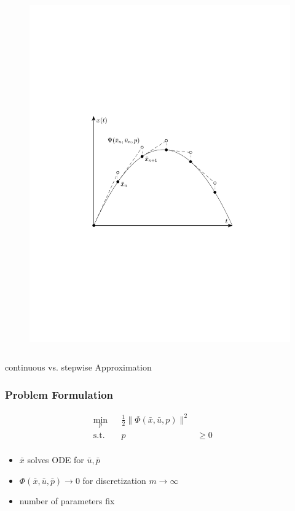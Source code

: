 \begin{frame}
\begin{columns}[t]
\begin{figure}
                \includegraphics[trim=3cm 7cm 3cm 9cm, clip=true, width=\linewidth]{img/stepExplEulerPlot}
            \end{figure}
    \end{columns}
    \begin{center}
        continuous vs. stepwise Approximation
    \end{center}
\end{frame}

\begin{frame}
    \frametitle{Problem Formulation}
    \begin{align*}
        \min_{p}  & & \frac{1}{2} \| \Phi(\bar{x},\bar{u},p) \|^2 & & \\
        \operatorname{s.t.} & & p & \geq 0 & & \\
    \end{align*}
    \begin{itemize}
        \item{$\bar{x}$ solves ODE for $\bar{u},\bar{p}$}
        \item{$\Phi(\bar{x},\bar{u},\bar{p}) \rightarrow 0$ for discretization $m \rightarrow \infty$}
        \item{number of parameters fix}
    \end{itemize}
\end{frame}

